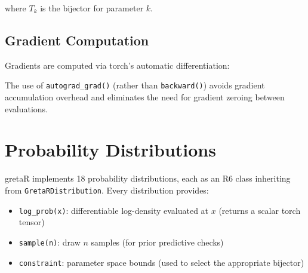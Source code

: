 \documentclass[
  11pt,
]{article}
\newenvironment{Shaded}{\begin{snugshade}}{\end{snugshade}}
\newcommand{\AttributeTok}[1]{\textcolor[rgb]{0.13,0.29,0.53}{#1}}
\newcommand{\ConstantTok}[1]{\textcolor[rgb]{0.56,0.35,0.01}{#1}}
\newcommand{\ControlFlowTok}[1]{\textcolor[rgb]{0.13,0.29,0.53}{\textbf{#1}}}
\newcommand{\DecValTok}[1]{\textcolor[rgb]{0.00,0.00,0.81}{#1}}
\newcommand{\FunctionTok}[1]{\textcolor[rgb]{0.13,0.29,0.53}{\textbf{#1}}}
\newcommand{\NormalTok}[1]{#1}
\newcommand{\OtherTok}[1]{\textcolor[rgb]{0.56,0.35,0.01}{#1}}
\newcommand{\SpecialCharTok}[1]{\textcolor[rgb]{0.81,0.36,0.00}{\textbf{#1}}}
\providecommand{\tightlist}{%
  \setlength{\itemsep}{0pt}\setlength{\parskip}{0pt}}
\begin{document}
where \(T_k\) is the bijector for parameter \(k\).

\subsection{Gradient Computation}\label{gradient-computation}

Gradients are computed via torch's automatic differentiation:

\begin{Shaded}
\end{Shaded}

The use of \texttt{autograd\_grad()} (rather than \texttt{backward()})
avoids gradient accumulation overhead and eliminates the need for
gradient zeroing between evaluations.

\section{Probability Distributions}\label{probability-distributions}

gretaR implements 18 probability distributions, each as an R6 class
inheriting from \texttt{GretaRDistribution}. Every distribution
provides:

\begin{itemize}
\tightlist
\item
  \texttt{log\_prob(x)}: differentiable log-density evaluated at \(x\)
  (returns a scalar torch tensor)
\item
  \texttt{sample(n)}: draw \(n\) samples (for prior predictive checks)
\item
  \texttt{constraint}: parameter space bounds (used to select the
  appropriate bijector)
\end{itemize}
\end{document}
